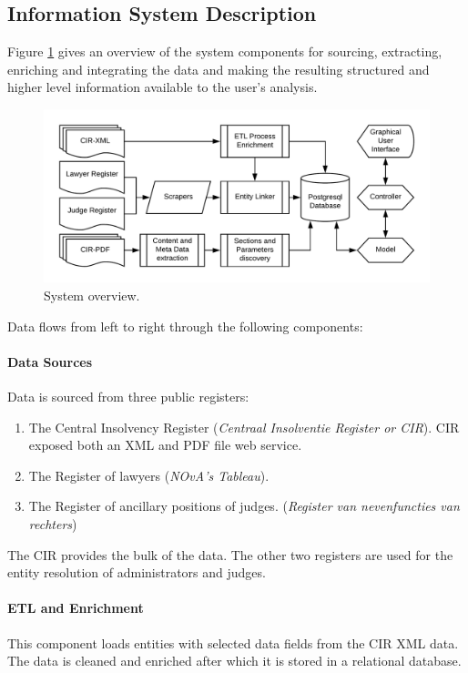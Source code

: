 \subsection{Information System Description}
Figure \ref{System overview} gives an overview of the system components for sourcing, extracting, enriching and integrating the  data and making the resulting structured and higher level information available to the user's analysis.

\begin{figure}[h]
\includegraphics[width=1\linewidth]{images/system_overview.png}
\caption{System overview.}\label{System overview}
\end{figure}

Data flows from left to right through the following components:

\paragraph{Data Sources} Data is sourced from three public registers:
\begin{enumerate}
	\item The Central Insolvency Register (\textit{Centraal Insolventie Register or CIR}). CIR exposed both an XML and PDF file web service.
	\item The Register of lawyers (\textit{NOvA's Tableau}).
	\item The Register of ancillary positions of judges. (\textit{Register van nevenfuncties van rechters}) 
\end{enumerate}

The CIR provides the bulk of the data. The other two registers are used for the entity resolution of administrators and judges.

\paragraph{ETL and Enrichment} This component loads entities with selected data fields from the CIR XML data. The data is cleaned and enriched after which it is stored in a relational database.

